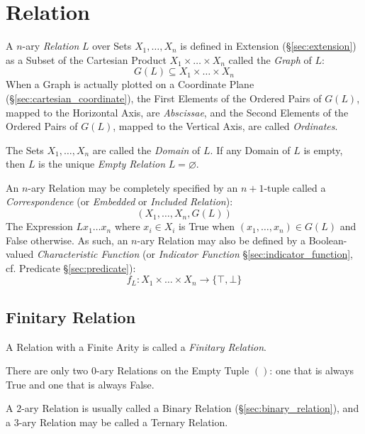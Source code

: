 \section{Relation}\label{sec:relation}

A $n$-ary \emph{Relation} $L$ over Sets $X_1, \ldots, X_n$ is defined
in Extension (\S\ref{sec:extension}) as a Subset of the Cartesian
Product $X_1 \times \ldots \times X_n$ called the \emph{Graph} of $L$:
\[
  G(L) \subseteq X_1 \times \ldots \times X_n
\]
When a Graph is actually plotted on a Coordinate Plane
(\S\ref{sec:cartesian_coordinate}), the First Elements of the Ordered
Pairs of $G(L)$, mapped to the Horizontal Axis, are \emph{Abscissae},
and the Second Elements of the Ordered Pairs of $G(L)$, mapped to the
Vertical Axis, are called \emph{Ordinates}.

The Sets $X_1, \ldots, X_n$ are called the \emph{Domain} of $L$. If
any Domain of $L$ is empty, then $L$ is the unique \emph{Empty
  Relation} $L = \varnothing$.

An $n$-ary Relation may be completely specified by an $n + 1$-tuple
called a \emph{Correspondence} (or \emph{Embedded} or \emph{Included
  Relation}):
\[
  (X_1, \ldots, X_n, G(L))
\]
The Expression $L x_1 \ldots x_n$ where $x_i \in X_i$ is True when
$(x_1, \ldots, x_n) \in G(L)$ and False otherwise. As such, an $n$-ary
Relation may also be defined by a Boolean-valued \emph{Characteristic
  Function} (or \emph{Indicator Function}
\S\ref{sec:indicator_function}, cf. Predicate \S\ref{sec:predicate}):
\[
  f_L : X_1 \times \ldots \times X_n \rightarrow \{\top,\bot\}
\]



\subsection{Finitary Relation}\label{sec:finitary_relation}

A Relation with a Finite Arity is called a \emph{Finitary Relation}.

There are only two $0$-ary Relations on the Empty Tuple $()$: one that
is always True and one that is always False.

A $2$-ary Relation is usually called a Binary Relation
(\S\ref{sec:binary_relation}), and a $3$-ary Relation may be called a
Ternary Relation.



